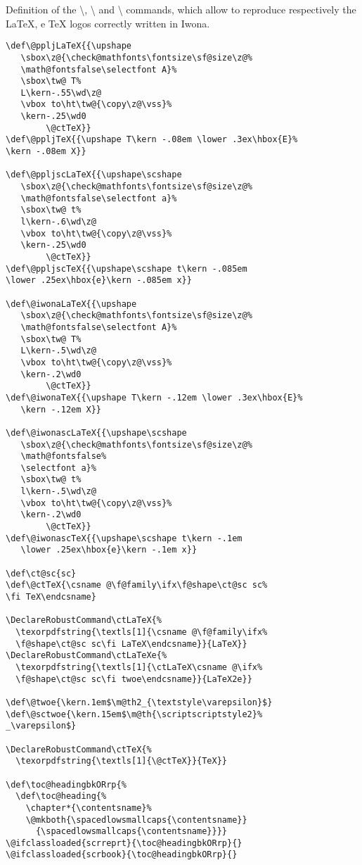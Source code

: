 Definition of the
{\ttfamily\textbackslash\color{RoyalBlue}{ctLaTeX}},
{\ttfamily\textbackslash\color{RoyalBlue}{ctLaTeXe}} and
{\ttfamily\textbackslash\color{RoyalBlue}{ctTeX}} commands,
which allow to reproduce respectively the \LaTeX, \LaTeXe{} e \TeX{} logos correctly written in Iwona.
\begin{lstlisting}
\def\@ppljLaTeX{{\upshape
   \sbox\z@{\check@mathfonts\fontsize\sf@size\z@%
   \math@fontsfalse\selectfont A}%
   \sbox\tw@ T%
   L\kern-.55\wd\z@
   \vbox to\ht\tw@{\copy\z@\vss}%
   \kern-.25\wd0
        \@ctTeX}}
\def\@ppljTeX{{\upshape T\kern -.08em \lower .3ex\hbox{E}%
\kern -.08em X}}

\def\@ppljscLaTeX{{\upshape\scshape
   \sbox\z@{\check@mathfonts\fontsize\sf@size\z@%
   \math@fontsfalse\selectfont a}%
   \sbox\tw@ t%
   l\kern-.6\wd\z@
   \vbox to\ht\tw@{\copy\z@\vss}%
   \kern-.25\wd0
        \@ctTeX}}
\def\@ppljscTeX{{\upshape\scshape t\kern -.085em
\lower .25ex\hbox{e}\kern -.085em x}}

\def\@iwonaLaTeX{{\upshape
   \sbox\z@{\check@mathfonts\fontsize\sf@size\z@%
   \math@fontsfalse\selectfont A}%
   \sbox\tw@ T%
   L\kern-.5\wd\z@
   \vbox to\ht\tw@{\copy\z@\vss}%
   \kern-.2\wd0
        \@ctTeX}}
\def\@iwonaTeX{{\upshape T\kern -.12em \lower .3ex\hbox{E}%
   \kern -.12em X}}

\def\@iwonascLaTeX{{\upshape\scshape
   \sbox\z@{\check@mathfonts\fontsize\sf@size\z@%
   \math@fontsfalse%
   \selectfont a}%
   \sbox\tw@ t%
   l\kern-.5\wd\z@
   \vbox to\ht\tw@{\copy\z@\vss}%
   \kern-.2\wd0
        \@ctTeX}}
\def\@iwonascTeX{{\upshape\scshape t\kern -.1em
   \lower .25ex\hbox{e}\kern -.1em x}}

\def\ct@sc{sc}
\def\@ctTeX{\csname @\f@family\ifx\f@shape\ct@sc sc%
\fi TeX\endcsname}

\DeclareRobustCommand\ctLaTeX{%
  \texorpdfstring{\textls[1]{\csname @\f@family\ifx%
  \f@shape\ct@sc sc\fi LaTeX\endcsname}}{LaTeX}}
\DeclareRobustCommand\ctLaTeXe{%
  \texorpdfstring{\textls[1]{\ctLaTeX\csname @\ifx%
  \f@shape\ct@sc sc\fi twoe\endcsname}}{LaTeX2e}}

\def\@twoe{\kern.1em$\m@th2_{\textstyle\varepsilon}$}
\def\@sctwoe{\kern.15em$\m@th{\scriptscriptstyle2}%
_\varepsilon$}

\DeclareRobustCommand\ctTeX{%
  \texorpdfstring{\textls[1]{\@ctTeX}}{TeX}}

\def\toc@headingbkORrp{%
  \def\toc@heading{%
    \chapter*{\contentsname}%
    \@mkboth{\spacedlowsmallcaps{\contentsname}}
      {\spacedlowsmallcaps{\contentsname}}}}
\@ifclassloaded{scrreprt}{\toc@headingbkORrp}{}
\@ifclassloaded{scrbook}{\toc@headingbkORrp}{}
\end{lstlisting}
